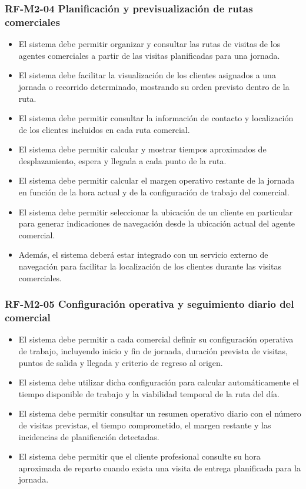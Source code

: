 \vspace{-0.75em}
\subsubsection{RF-M2-04 Planificación y previsualización de rutas comerciales}
\vspace{-1em}

\begin{itemize}
    \item El sistema debe permitir organizar y consultar las rutas de visitas de los agentes comerciales a partir de las visitas planificadas para una jornada.
    \item El sistema debe facilitar la visualización de los clientes asignados a una jornada o recorrido determinado, mostrando su orden previsto dentro de la ruta.
    \item El sistema debe permitir consultar la información de contacto y localización de los clientes incluidos en cada ruta comercial.
    \item El sistema debe permitir calcular y mostrar tiempos aproximados de desplazamiento, espera y llegada a cada punto de la ruta.
    \item El sistema debe permitir calcular el margen operativo restante de la jornada en función de la hora actual y de la configuración de trabajo del comercial.
    \item El sistema debe permitir seleccionar la ubicación de un cliente en particular para generar indicaciones de navegación desde la ubicación actual del agente comercial.
    \item Además, el sistema deberá estar integrado con un servicio externo de navegación para facilitar la localización de los clientes durante las visitas comerciales.
\end{itemize}

\vspace{-0.75em}
\subsubsection{RF-M2-05 Configuración operativa y seguimiento diario del comercial}
\vspace{-1em}

\begin{itemize}
    \item El sistema debe permitir a cada comercial definir su configuración operativa de trabajo, incluyendo inicio y fin de jornada, duración prevista de visitas, puntos de salida y llegada y criterio de regreso al origen.
    \item El sistema debe utilizar dicha configuración para calcular automáticamente el tiempo disponible de trabajo y la viabilidad temporal de la ruta del día.
    \item El sistema debe permitir consultar un resumen operativo diario con el número de visitas previstas, el tiempo comprometido, el margen restante y las incidencias de planificación detectadas.
    \item El sistema debe permitir que el cliente profesional consulte su hora aproximada de reparto cuando exista una visita de entrega planificada para la jornada.
\end{itemize}


